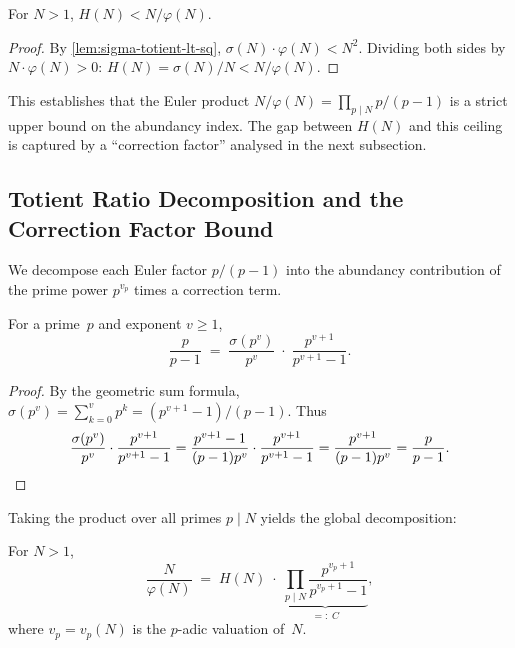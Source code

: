 \begin{theorem}\label{thm:euler-ceiling}
  For $N > 1$, $H(N) < N/\varphi(N)$.
\end{theorem}

\begin{proof}
By \cref{lem:sigma-totient-lt-sq}, $\sigma(N)\cdot\varphi(N) < N^2$.
Dividing both sides by $N \cdot \varphi(N) > 0$:
$H(N) = \sigma(N)/N < N/\varphi(N)$.
\end{proof}

This establishes that the Euler product
$N/\varphi(N) = \prod_{p\mid N} p/(p-1)$ is a strict upper bound on the
abundancy index.  The gap between $H(N)$ and this ceiling is captured by
a ``correction factor'' analysed in the next subsection.


\subsection{Totient Ratio Decomposition and the Correction Factor Bound}
\label{subsec:totient_decomposition}

We decompose each Euler factor $p/(p-1)$ into the abundancy contribution
of the prime power $p^{v_p}$ times a correction term.

\begin{lemma}\label{lem:euler-factor-decomp}
  For a prime~$p$ and exponent $v \ge 1$,
  \[
    \frac{p}{p-1}
    \;=\;
    \frac{\sigma(p^v)}{p^v}
    \;\cdot\;
    \frac{p^{v+1}}{p^{v+1}-1}.
  \]
\end{lemma}

\begin{proof}
By the geometric sum formula, $\sigma(p^v) = \sum_{k=0}^{v} p^k = (p^{v+1}-1)/(p-1)$.
Thus
\[
  \frac{\sigma(p^v)}{p^v} \cdot \frac{p^{v+1}}{p^{v+1}-1}
  = \frac{p^{v+1}-1}{(p-1)p^v} \cdot \frac{p^{v+1}}{p^{v+1}-1}
  = \frac{p^{v+1}}{(p-1)p^v} = \frac{p}{p-1}. \qedhere
\]
\end{proof}

Taking the product over all primes $p \mid N$ yields the global
decomposition:

\begin{theorem}\label{thm:totient-decomp}
  For $N > 1$,
  \[
    \frac{N}{\varphi(N)}
    \;=\;
    H(N)
    \;\cdot\;
    \underbrace{\prod_{p \mid N}
      \frac{p^{v_p+1}}{p^{v_p+1}-1}}_{=:\;C},
  \]
  where $v_p = v_p(N)$ is the $p$-adic valuation of~$N$.
\end{theorem}

